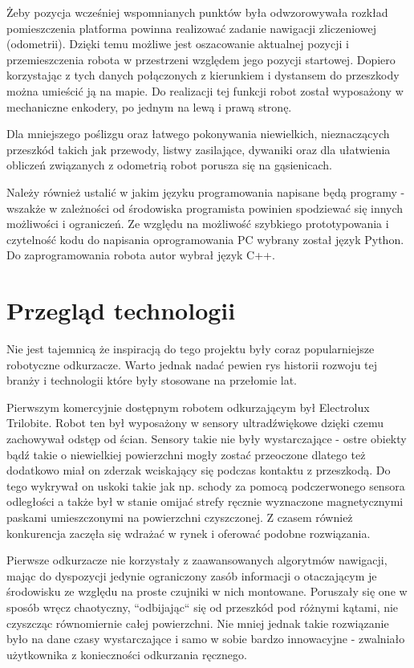 Żeby pozycja wcześniej wspomnianych punktów była odwzorowywała rozkład pomieszczenia platforma powinna realizować zadanie nawigacji zliczeniowej (odometrii). Dzięki temu możliwe jest oszacowanie aktualnej pozycji i przemieszczenia robota w przestrzeni względem jego pozycji startowej. Dopiero korzystając z tych danych połączonych z kierunkiem i dystansem do przeszkody można umieścić ją na mapie. Do realizacji tej funkcji robot został wyposażony w mechaniczne enkodery, po jednym na lewą i prawą stronę.

Dla mniejszego poślizgu oraz łatwego pokonywania niewielkich, nieznaczących przeszkód takich jak przewody, listwy zasilające, dywaniki oraz dla ułatwienia obliczeń związanych z odometrią robot porusza się na gąsienicach.

Należy również ustalić w jakim języku programowania napisane będą programy - wszakże w zależności od środowiska programista powinien spodziewać się innych możliwości i ograniczeń. Ze względu na możliwość szybkiego prototypowania i czytelność kodu do napisania oprogramowania PC wybrany został język Python\cite{python}. Do zaprogramowania robota autor wybrał język C++\cite{cpp}.

\section{Przegląd technologii}
Nie jest tajemnicą że inspiracją do tego projektu były coraz popularniejsze robotyczne odkurzacze. Warto jednak nadać pewien rys historii rozwoju tej branży i technologii które były stosowane na przełomie lat.

Pierwszym komercyjnie dostępnym robotem odkurzającym był Electrolux Trilobite\cite{vacuum-history}. Robot ten był wyposażony w sensory ultradźwiękowe dzięki czemu zachowywał odstęp od ścian. Sensory takie nie były wystarczające - ostre obiekty bądź takie o niewielkiej powierzchni mogły zostać przeoczone dlatego też dodatkowo miał on zderzak wciskający się podczas kontaktu z przeszkodą. Do tego wykrywał on uskoki takie jak np. schody za pomocą podczerwonego sensora odległości a także był w stanie omijać strefy ręcznie wyznaczone magnetycznymi paskami umieszczonymi na powierzchni czyszczonej. Z czasem również konkurencja zaczęła się wdrażać w rynek i oferować podobne rozwiązania.

Pierwsze odkurzacze nie korzystały z zaawansowanych algorytmów nawigacji, mając do dyspozycji jedynie ograniczony zasób informacji o otaczającym je środowisku ze względu na proste czujniki w nich montowane. Poruszały się one w sposób wręcz chaotyczny, ``odbijając`` się od przeszkód pod różnymi kątami, nie czyszcząc równomiernie całej powierzchni. Nie mniej jednak takie rozwiązanie było na dane czasy wystarczające i samo w sobie bardzo innowacyjne - zwalniało użytkownika z konieczności odkurzania ręcznego.

